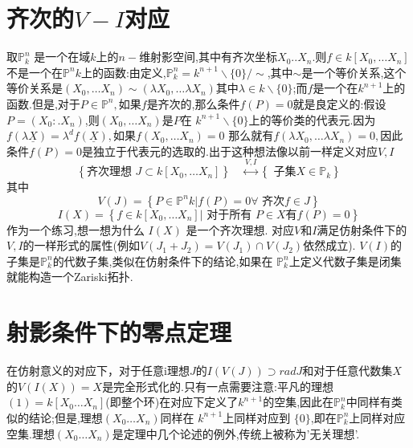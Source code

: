\documentclass[UTF8]{book}
\begin{document}
	\section{齐次的$ V-I $对应}
		取$\mathbb{P} ^{n}_{k}$ 是一个在域$ k $上的$ n- $维射影空间,其中有齐次坐标$X _{0} . . X _{ n }$.则$f \in k \left[ X _{0}, \ldots X _{ n }\right]$不是一个在$\mathbb{P} ^{ n } k $上的函数:由定义,$\mathbb{P} ^{ n }_{ k }= k ^{ n +1} \backslash\{0\} / \sim$,其中$\sim$是一个等价关系,这个等价关系是$\left( X _{0}, \ldots X _{ n }\right) \sim\left(\lambda X _{0}, \ldots \lambda X _{ n }\right)$其中$\lambda \in k \backslash\{0\} $;而$ f $是一个在$k ^{n+1}$上的函数.但是,对于$P \in \mathbb{P}^{n} ,$如果$ f $是齐次的,那么条件$f ( P )=0$就是良定义的:假设$P =\left( X _{0}: . X _{ n }\right)$,则$\left(X_{0}, \ldots X_{n}\right)$是$ P $在 $k^{n+1} \backslash\{0\}$上的等价类的代表元.因为$f(\lambda \underline{X})=\lambda^{d} f(\underline{X}),$如果$f\left(X_{0}, \ldots X_{n}\right)=0$ 那么就有$f\left(\lambda X_{0}, \ldots \lambda X_{n}\right)=0,$因此条件$f ( P )=0$是独立于代表元的选取的.出于这种想法像以前一样定义对应$ V,I $
		\begin{equation*}
		\left\{\text {齐次理想 } J \subset k \left[ X _{0}, \dots X _{ n }\right]\right\} \quad \stackrel{ V , I }{\longleftrightarrow}\left\{\text { 子集} X \in \mathbb{P} _{ k }\right\}
		\end{equation*}
		其中
		\begin{equation*}
		V ( J )=\left\{ P \in \mathbb{P} ^{ n } k | f ( P )=0 \forall \text { 齐次} f \in J \right\}
		\end{equation*}
		\begin{equation*}
		I ( X )=\left\{ f \in k \left[ X _{0}, \ldots X _{ n }\right] |  \text { 对于所有 } P \in X \text{有} f ( P )=0\right\}
		\end{equation*}
		作为一个练习,想一想为什么 $I ( X )$ 是一个齐次理想.
		对应$ V $和$ I $满足仿射条件下的$ V,I $的一样形式的属性(例如$V \left( J _{1}+ J _{2}\right)=  V \left( J _{1}\right) \cap V \left( J _{2}\right) $依然成立). $V ( I )$的子集是$\mathbb{P}^{n} _{ k }$的代数子集,类似在仿射条件下的结论,如果在 $\mathbb{P} ^{n}_{k}$上定义代数子集是闭集就能构造一个Zariski拓扑.
		
		
	\section{射影条件下的零点定理}
		在仿射意义的对应下，对于任意i理想$ J $的$I ( V ( J )) \supset rad J$和对于任意代数集$ X $的$ V(I(X))  = X$是完全形式化的.只有一点需要注意:平凡的理想$(1) = k \left[ X _{0} \ldots X _{ n }\right]$(即整个环)在对应下定义了$k ^{ n +1}$的空集,因此在$\mathbb{P} ^{n}_{ k }$中同样有类似的结论;但是,理想$\left(X_{0} \ldots X_{n}\right)$同样在 $k ^{n+1}$上同样对应到 $\{0\}$,即在$\mathbb{P} ^{n}_{ k }$上同样对应空集.理想$\left(X_{0} \ldots X_{n}\right)$是定理中几个论述的例外,传统上被称为'无关理想'.
		
\end{document}
